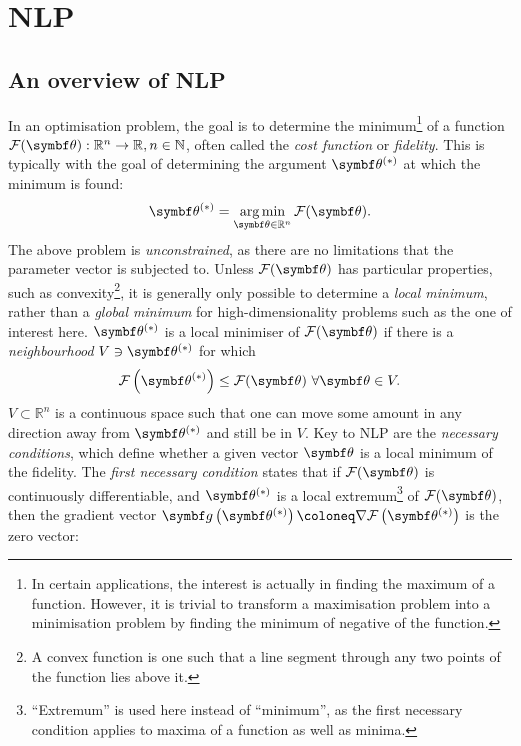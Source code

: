 \section{\Acl{NLP}}
\label{sec:nlp}

\subsection{An overview of \ac{NLP}}
\label{subsec:nlp-overview}
In an optimisation problem, the goal is to determine the minimum\footnote{
    In certain applications, the interest is actually in finding the maximum of
    a function. However, it is trivial to transform a maximisation problem into
    a minimisation problem by finding the minimum of negative of the function.
}
of a function $\Fth: \mathbb{R}^n \rightarrow \mathbb{R}, n \in \mathbb{N}$, often
called the \emph{cost function} or \emph{fidelity}.
This is typically with the goal of determining the argument $\bthstar$ at
which the minimum is found:
\begin{equation}
    \bthstar = \argmin_{\bth \in \mathbb{R}^n} \Fth.
    \label{eq:minF}
\end{equation}
The above problem is \emph{unconstrained}, as there are no limitations that the
parameter vector is subjected to. Unless $\Fth$ has particular properties, such
as convexity\footnote{
    A convex function is one such that a line segment through any two points of
    the function lies above it.
}, it is generally only possible to determine a \emph{local minimum},
rather than a \emph{global minimum} for high-dimensionality problems such as
the one of interest here. $\bthstar$ is a local
minimiser of $\Fth$ if there is a \emph{neighbourhood} $V \ni \bthstar$ for which
\begin{equation}
    \Fthstar \leq \Fth\ \forall \bth \in V.
  \label{def:local-minimiser}
\end{equation}
$V \subset \mathbb{R}^n$ is a continuous space such that one can move some
amount in any direction away from $\bthstar$ and still be in $V$.
Key to \ac{NLP} are the \emph{necessary conditions}, which define whether a
given vector $\bth$ is a local minimum of the fidelity.
The \emph{first necessary condition} states
that if $\Fth$ is continuously differentiable, and $\bthstar$ is a local extremum\footnote{
    ``Extremum'' is used here instead of ``minimum'', as the first necessary
    condition applies to maxima of a function as well as minima.
} of $\Fth$, then the gradient vector $\bdgthstar \coloneq \nabla \Fthstar$ is the
zero vector:
